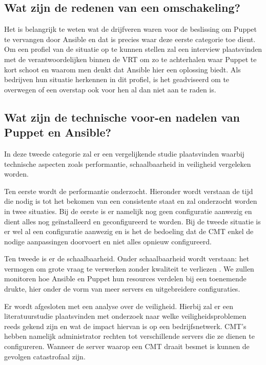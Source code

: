 \subsection{Wat zijn de redenen van een omschakeling?}

Het is belangrijk te weten wat de drijfveren waren voor de beslissing om Puppet te vervangen door Ansible en dat is precies waar deze eerste categorie toe dient. Om een profiel van de situatie op te kunnen stellen zal een interview plaatsvinden met de verantwoordelijken binnen de VRT om zo te achterhalen waar Puppet te kort schoot en waarom men denkt dat Ansible hier een oplossing biedt. Als bedrijven hun situatie herkennen in dit profiel, is het geadviseerd om te overwegen of een overstap ook voor hen al dan niet aan te raden is.

\subsection{Wat zijn de technische voor-en nadelen van Puppet en Ansible?}

In deze tweede categorie zal er een vergelijkende studie plaatsvinden waarbij technische aspecten zoals performantie, schaalbaarheid in veiligheid vergeleken worden. 
 
 Ten eerste wordt de performantie onderzocht. Hieronder wordt verstaan de tijd die nodig is tot het bekomen van een consistente staat en zal onderzocht worden in twee situaties. Bij de eerste is er namelijk nog geen configuratie aanwezig en dient alles nog ge\"installeerd en geconfigureerd te worden. Bij de tweede situatie is er wel al een configuratie aanwezig en is het de bedoeling dat de CMT enkel de nodige aanpassingen doorvoert en niet alles opnieuw configureerd. 

Ten tweede is er de schaalbaarheid. Onder schaalbaarheid wordt verstaan: het vermogen om grote vraag te verwerken zonder kwaliteit te verliezen \autocite{informit}. We zullen monitoren hoe Ansible en Puppet hun resources verdelen bij een toenemende drukte, hier onder de vorm van meer servers en uitgebreidere configuraties. 

Er wordt afgesloten met een analyse over de veiligheid. Hierbij zal er een literatuurstudie plaatsvinden met onderzoek naar welke veiligheidsproblemen reeds gekend zijn en wat de impact hiervan is op een bedrijfsnetwerk. CMT's hebben namelijk  administrator rechten tot verschillende servers die ze dienen te configureren. Wanneer de server waarop een CMT draait besmet is kunnen de gevolgen catastrofaal zijn.

